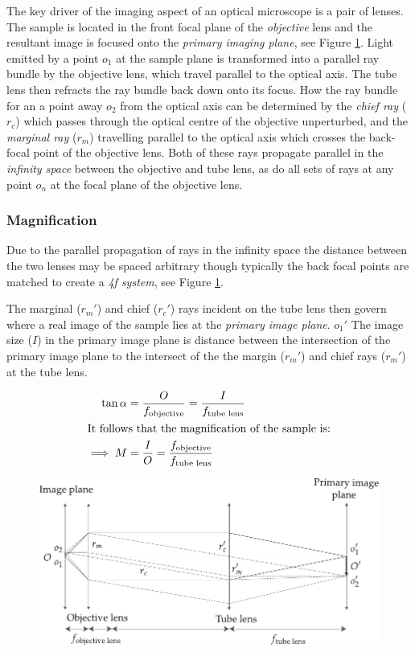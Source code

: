 The key driver of the imaging aspect of an optical microscope is a pair of lenses.
The sample is located in the front focal plane of the \emph{objective} lens and the resultant image is focused onto the \emph{primary imaging plane}, see Figure \ref{fig:magnification}.
Light emitted by a point $o_1$ at the sample plane is transformed into a parallel ray bundle by the objective lens, which travel parallel to the optical axis.
The tube lens then refracts the ray bundle back down onto its focus.
How the ray bundle for an a point away $o_2$ from the optical axis can be determined by the \emph{chief ray} ($r_c$) which passes through the optical centre of the objective unperturbed, and the \emph{marginal ray} ($r_m$) travelling parallel to the optical axis which crosses the back-focal point of the objective lens.
Both of these rays propagate parallel in the \emph{infinity space} between the objective and tube lens, as do all sets of rays at any point $o_n$ at the focal plane of the objective lens.

\subsubsection{Magnification}

Due to the parallel propagation of rays in the infinity space the distance between the two lenses may be spaced arbitrary though typically the back focal points are matched to create a \emph{4f system}, see Figure \ref{fig:magnification}.

The marginal ($r_m'$) and chief ($r_c'$) rays incident on the tube lens then govern where a real image of the sample lies at the \emph{primary image plane}. %
$o_1'$
The image size ($I$) in the primary image plane is distance between the intersection of the primary image plane to the intersect of the the margin ($r_m'$) and chief rays ($r_m'$) at the tube lens.

\begin{align}
    \tan \alpha &= \frac{O}{f_{\text{objective}}} =  \frac{I}{f_{\text{tube lens}}} \\
    \intertext{It follows that the magnification of the sample is:}
    \implies M &= \frac{I}{O} = \frac{f_{\text{objective}}}
{f_{\text{tube lens}}}
\end{align}

\begin{figure}
    \centering
    \includegraphics{./magnification}
    \caption{}
    \label{fig:magnification}
\end{figure}

